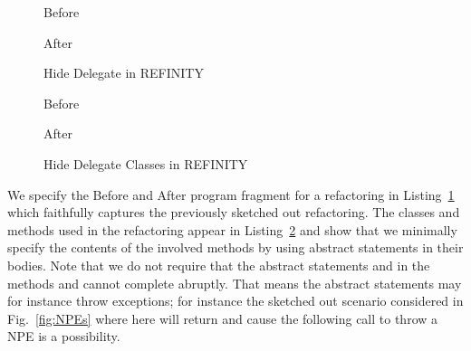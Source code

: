\begin{figure}[tbp]
  \captionsetup{type=lstlisting}
  \centering
  \begin{sublstlisting}[b]{.455\linewidth}
    
    \caption{Before}
    \label{lst:HideDelegate-nofields-before-refinity}
  \end{sublstlisting}\hspace{1cm}
  \begin{sublstlisting}[b]{.455\linewidth}
    
    \caption{After}
    \label{lst:HideDelegate-nofields-after-refinity}
  \end{sublstlisting}
\caption{Hide Delegate in REFINITY}
\label{lst:HideDelegate-nofields-refinity}
\end{figure}

\begin{figure}[tbp]
  \captionsetup{type=lstlisting}
  \centering
  \begin{sublstlisting}[b]{.4\linewidth}
    
    \caption{Before}
    \label{lst:HideDelegate-nofields-resource-refinity}
  \end{sublstlisting}\hspace{1cm}
  \begin{sublstlisting}[b]{.4\linewidth}
    
    \caption{After}
    \label{lst:HideDelegate-nofields-owner-refinity}
  \end{sublstlisting}
\caption{Hide Delegate Classes in REFINITY}
\label{lst:HideDelegate-nofields-classes-refinity}
\end{figure}
We specify the Before and After program fragment for a  refactoring in Listing~\ref{lst:HideDelegate-nofields-refinity} which faithfully captures the previously sketched out refactoring.
The classes and methods used in the refactoring appear in Listing~\ref{lst:HideDelegate-nofields-classes-refinity} and show that we minimally specify the contents of the involved methods by using abstract
statements in their bodies.
Note that we do not require that the abstract statements  and  in the methods  and  cannot complete abruptly.
That means the abstract statements may for instance throw exceptions; for instance the sketched out scenario considered in Fig.~\ref{fig:NPEs} where here  will return  and cause the following call to throw a NPE is a possibility.

